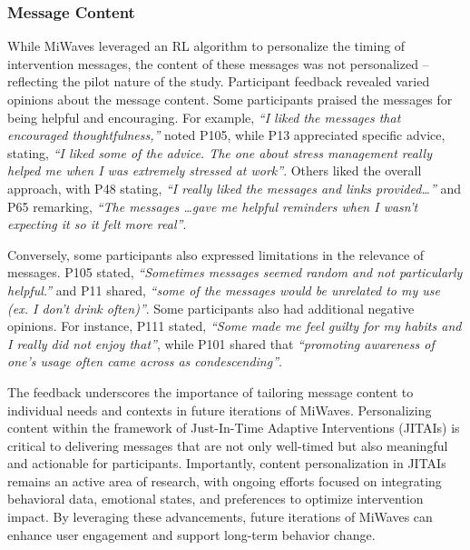 \subsubsection{Message Content}
While MiWaves leveraged an RL algorithm to personalize the timing of intervention messages, the content of these messages was not personalized -- reflecting the pilot nature of the study. Participant feedback revealed varied opinions about the message content. Some participants praised the messages for being helpful and encouraging. For example, \emph{``I liked the messages that encouraged thoughtfulness,''} noted P105, while 
P13 appreciated specific advice, stating, \emph{``I liked some of the advice. The one about stress management really helped me when I was extremely stressed at work''}. Others liked the overall approach, with P48 stating, \emph{``I really liked the messages and links provided\ldots''} and P65 remarking, \emph{``The messages \ldots gave me helpful reminders when I wasn’t expecting it so it felt more real''}.

Conversely, some participants also expressed limitations in the relevance of messages.
P105 stated, \emph{``Sometimes messages seemed random and not particularly helpful.''} 
and P11 shared, \emph{``some of the messages would be unrelated to my use (ex. I don’t drink often)''}. 
Some participants also had additional negative opinions. For instance, P111 stated, \emph{``Some made me feel guilty for my habits and I really did not enjoy that''}, while 
P101 shared that \emph{``promoting awareness of one's usage often came across as condescending''}.

The feedback underscores the importance of tailoring message content to individual needs and contexts in future iterations of MiWaves. Personalizing content within the framework of Just-In-Time Adaptive Interventions (JITAIs) is critical to delivering messages that are not only well-timed but also meaningful and actionable for participants. Importantly, content personalization in JITAIs remains an active area of research, with ongoing efforts focused on integrating behavioral data, emotional states, and preferences to optimize intervention impact. By leveraging these advancements, future iterations of MiWaves can enhance user engagement and support long-term behavior change.

